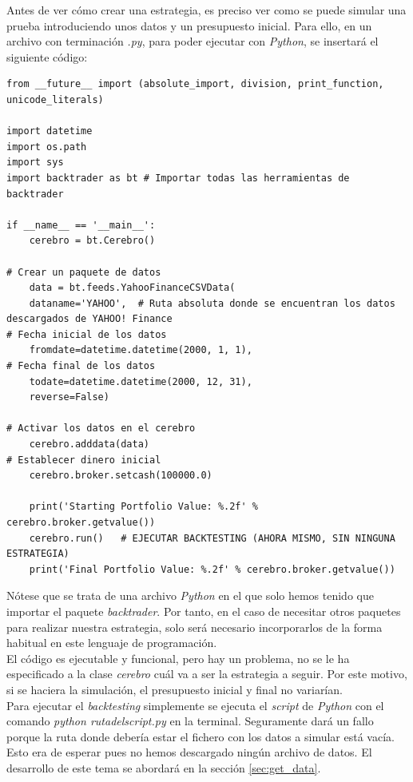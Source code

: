 		Antes de ver c\'omo crear una estrategia, es preciso ver como se puede simular una prueba introduciendo unos datos y un presupuesto inicial. Para ello, en un archivo con terminaci\'on \textit{.py}, para poder ejecutar con \textit{Python}, se insertar\'a el siguiente c\'odigo:\\
		
		\begin{lstlisting}[basicstyle=\tiny]
from __future__ import (absolute_import, division, print_function, unicode_literals)
		
import datetime
import os.path
import sys
import backtrader as bt # Importar todas las herramientas de backtrader
		
if __name__ == '__main__':
	cerebro = bt.Cerebro()
		
# Crear un paquete de datos
	data = bt.feeds.YahooFinanceCSVData(
	dataname='YAHOO',  # Ruta absoluta donde se encuentran los datos descargados de YAHOO! Finance
# Fecha inicial de los datos
	fromdate=datetime.datetime(2000, 1, 1),
# Fecha final de los datos
	todate=datetime.datetime(2000, 12, 31),
	reverse=False)
		
# Activar los datos en el cerebro
	cerebro.adddata(data)
# Establecer dinero inicial    
	cerebro.broker.setcash(100000.0)
		
	print('Starting Portfolio Value: %.2f' % cerebro.broker.getvalue())
	cerebro.run()   # EJECUTAR BACKTESTING (AHORA MISMO, SIN NINGUNA ESTRATEGIA)
	print('Final Portfolio Value: %.2f' % cerebro.broker.getvalue())
		\end{lstlisting}
		
		\vspace{0.5cm}
		
		N\'otese que se trata de una archivo \textit{Python} en el que solo hemos tenido que importar el paquete \textit{backtrader}. Por tanto, en el caso de necesitar otros paquetes para realizar nuestra estrategia, solo ser\'a necesario incorporarlos de la forma habitual en este lenguaje de programaci\'on.\\
		
		El c\'odigo es ejecutable y funcional, pero hay un problema, no se le ha especificado a la clase \textit{cerebro} cu\'al va a ser la estrategia a seguir. Por este motivo, si se haciera la simulaci\'on, el presupuesto inicial y final no variar\'ian. \\
		
		Para ejecutar el \textit{backtesting} simplemente se ejecuta el \textit{script} de \textit{Python} con el comando \textit{python rutadelscript.py} en la terminal. Seguramente dar\'a un fallo porque la ruta donde deber\'ia estar el fichero con los datos a simular est\'a vac\'ia. Esto era de esperar pues no hemos descargado ning\'un archivo de datos. El desarrollo de este tema se abordar\'a en la secci\'on \ref{sec:get_data}.\\
		
